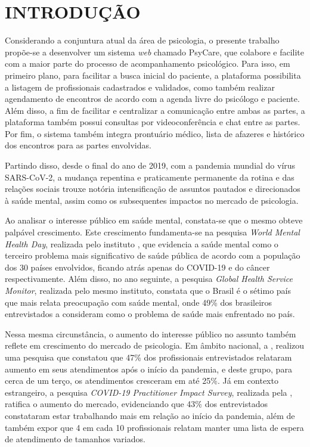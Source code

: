 \chapter{INTRODUÇÃO}
\label{chap:introducao}

Considerando a conjuntura atual da área de psicologia, o presente trabalho propõe-se a desenvolver um sistema \textit{web} chamado PsyCare, que colabore e facilite com a maior parte do processo de acompanhamento psicológico. Para isso, em primeiro plano, para facilitar a busca inicial do paciente, a plataforma possibilita a listagem de profissionais cadastrados e validados, como também realizar agendamento de encontros de acordo com a agenda livre do psicólogo e paciente. Além disso, a fim de facilitar e centralizar a comunicação entre ambas as partes, a plataforma também possui consultas por videoconferência e chat entre as partes. Por fim, o sistema também integra prontuário médico, lista de afazeres e histórico dos encontros para as partes envolvidas.

Partindo disso, desde o final do ano de 2019, com a pandemia mundial do vírus SARS-CoV-2, a mudança repentina e praticamente permanente da rotina e das relações sociais trouxe notória intensificação de assuntos pautados e direcionados à saúde mental, assim como os subsequentes impactos no mercado de psicologia.

Ao analisar o interesse público em saúde mental, constata-se que o mesmo obteve palpável crescimento. Este crescimento fundamenta-se na pesquisa \textit{World Mental Health Day}, realizada pelo instituto , que evidencia a saúde mental como o terceiro problema mais significativo de saúde pública de acordo com a população dos 30 países envolvidos, ficando atrás apenas do COVID-19 e do câncer respectivamente. Além disso, no ano seguinte, a pesquisa \textit{Global Health Service Monitor}, realizada pelo mesmo instituto, constata que o Brasil é o sétimo país que mais relata preocupação com saúde mental, onde 49\% dos brasileiros entrevistados a consideram como o problema de saúde mais enfrentado no país.

Nessa mesma circunstância, o aumento do interesse público no assunto também reflete em crescimento do mercado de psicologia. Em âmbito nacional, a , realizou uma pesquisa que constatou que 47\% dos profissionais entrevistados relataram aumento em seus atendimentos após o início da pandemia, e deste grupo, para cerca de um terço, os atendimentos cresceram em até 25\%. Já em contexto estrangeiro, a pesquisa \textit{COVID-19 Practitioner Impact Survey}, realizada pela , ratifica o aumento do mercado, evidenciando que 43\% dos entrevistados constataram estar trabalhando mais em relação ao início da pandemia, além de também expor que 4 em cada 10 profissionais relatam manter uma lista de espera de atendimento de tamanhos variados.

